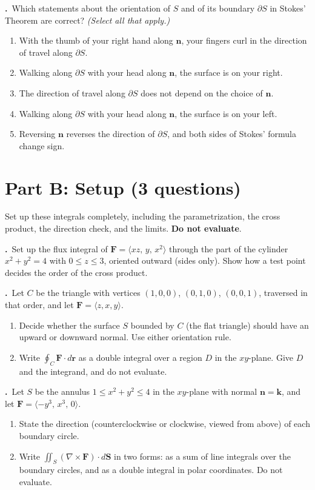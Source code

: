 \documentclass[11pt]{article}
\newcommand{\bF}{\mathbf{F}}
\newcommand{\br}{\mathbf{r}}
\newcommand{\bn}{\mathbf{n}}
\newcommand{\bk}{\mathbf{k}}
\newcommand{\curl}{\nabla\times}
\newcounter{qn}
\newcommand{\Q}{\par\vspace{6pt}\stepcounter{qn}\textbf{\theqn.}\ }
\begin{document}
\Q Which statements about the orientation of $S$ and of its boundary $\partial S$ in Stokes' Theorem are correct? \emph{(Select all that apply.)}
\begin{enumerate}[label=(\Alph*),nosep]
  \item With the thumb of your right hand along $\bn$, your fingers curl in the direction of travel along $\partial S$.
  \item Walking along $\partial S$ with your head along $\bn$, the surface is on your right.
  \item The direction of travel along $\partial S$ does not depend on the choice of $\bn$.
  \item Walking along $\partial S$ with your head along $\bn$, the surface is on your left.
  \item Reversing $\bn$ reverses the direction of $\partial S$, and both sides of Stokes' formula change sign.
\end{enumerate}

\section*{Part B: Setup (3 questions)}

Set up these integrals completely, including the parametrization, the cross product, the direction check, and the limits. \textbf{Do not evaluate}.

\Q Set up the flux integral of $\bF=\langle xz,\,y,\,x^2\rangle$ through the part of the cylinder $x^2+y^2=4$ with $0\le z\le3$, oriented outward (sides only). Show how a test point decides the order of the cross product.

\Q Let $C$ be the triangle with vertices $(1,0,0)$, $(0,1,0)$, $(0,0,1)$, traversed in that order, and let $\bF=\langle z,x,y\rangle$.
\begin{enumerate}[label=(\alph*),nosep]
  \item Decide whether the surface $S$ bounded by $C$ (the flat triangle) should have an upward or downward normal. Use either orientation rule.
  \item Write $\oint_C\bF\cdot d\br$ as a double integral over a region $D$ in the $xy$-plane. Give $D$ and the integrand, and do not evaluate.
\end{enumerate}

\Q Let $S$ be the annulus $1\le x^2+y^2\le4$ in the $xy$-plane with normal $\bn=\bk$, and let $\bF=\langle-y^3,\,x^3,\,0\rangle$.
\begin{enumerate}[label=(\alph*),nosep]
  \item State the direction (counterclockwise or clockwise, viewed from above) of each boundary circle.
  \item Write $\iint_S(\curl\bF)\cdot d\mathbf{S}$ in two forms: as a sum of line integrals over the boundary circles, and as a double integral in polar coordinates. Do not evaluate.
\end{enumerate}
\end{document}
